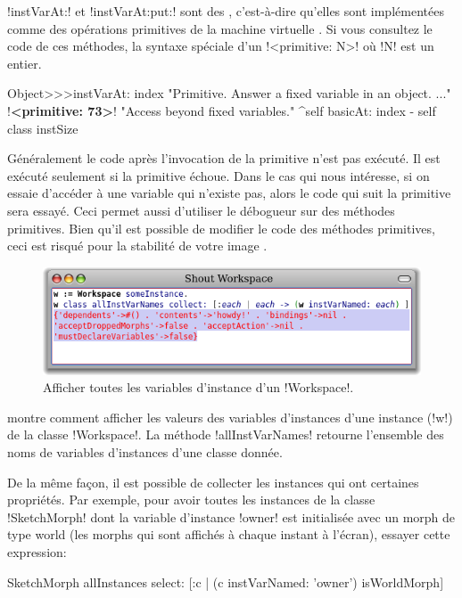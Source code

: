 \documentclass[a4paper,10pt,twoside]{book}
\begin{document}
\ct!instVarAt:! et \ct!instVarAt:put:! sont des , c'est-à-dire qu'elles sont implémentées comme des opérations primitives de la machine virtuelle \pharo.
Si vous consultez le code de ces méthodes, la syntaxe spéciale d'un  \ct!<primitive: N>! où \ct!N! est un entier.

\begin{code}{}
Object>>>instVarAt: index 
	"Primitive. Answer a fixed variable in an object. ..."
	!\textbf{<primitive: 73>}!
	"Access beyond fixed variables."
	^self basicAt: index - self class instSize		
\end{code}

Généralement le code après l'invocation de la primitive n'est pas exécuté. Il est exécuté seulement si la primitive échoue. Dans le cas qui nous intéresse, si on essaie d'accéder à une variable qui n'existe pas, alors le code qui suit la primitive sera essayé. Ceci permet aussi d'utiliser le débogueur sur des méthodes primitives.
Bien qu'il est possible de modifier le code des méthodes primitives, ceci est risqué pour la stabilité de votre image \pharo.

\begin{figure}[ht]\centering
	\includegraphics[width=\linewidth]{allInstanceVariables}
	\caption{Afficher toutes les variables d'instance d'un \ct!Workspace!.}
\end{figure}

 montre comment afficher les valeurs des variables d'instances d'une instance (\ct!w!)  de la classe \ct!Workspace!.
La méthode \ct!allInstVarNames! retourne l'ensemble des noms de variables d'instances d'une classe donnée.

De la même façon, il est possible de collecter les instances qui ont certaines propriétés.
Par exemple, pour avoir toutes les instances de la classe \ct!SketchMorph! dont la variable d'instance \ct!owner! est initialisée avec un morph de type world (\ie les morphs qui sont affichés à chaque instant à l'écran), essayer cette expression:
\begin{code}{}
SketchMorph allInstances select: [:c | (c instVarNamed: 'owner') isWorldMorph]
\end{code}
\end{document}
